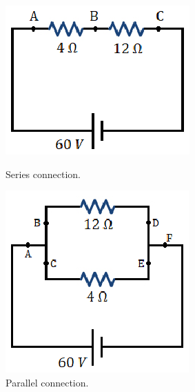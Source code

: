 \documentclass{scrartcl}
\begin{document}
    \begin{figure}[H]
        \centering
        \begin{minipage}[b]{0.4\textwidth}
            \includegraphics[width=\textwidth]{series.eps}
            \caption{Series connection.}
        \end{minipage}
        \hfill
        \begin{minipage}[b]{0.4\textwidth}
            \includegraphics[width=\textwidth]{parallel.eps}
            \caption{Parallel connection.}
        \end{minipage}
    \end{figure}
\end{document}
